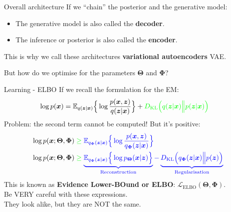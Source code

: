 \documentclass{beamer}
\newcommand{\bs}[1]{\boldsymbol{#1}}
\begin{document}
\begin{frame}{Overall architecture}
 If we ``chain'' the posterior and the generative model:\vspace{3mm}
   \vspace{3mm}
 
 \begin{itemize}
  \item The generative model is also called the \textbf{decoder}.
  \item The inference or posterior is also called the \textbf{encoder}.
 \end{itemize}\vspace{3mm}
 
 This is why we call these architectures \textbf{variational autoencoders} VAE.\vspace{3mm}
 
 But how do we optimise for the parameters $\bs{\Theta}$ and $\bs{\Phi}$?

\end{frame}

\begin{frame}{Learning - ELBO}
 If we recall the formulation for the EM:
 \begin{align}
\log p(\bs{x}) &= \mathbb{E}_{q(\bs{z}|\bs{x})}\Big\{\log \frac{p(\bs{x},\bs{z})}{q(\bs{z}|\bs{x})}\Big\} + {\color{green} D_{\text{KL}}\Big(q(\bs{z}|\bs{x})\Big\lVert p(\bs{z}|\bs{x})\Big)}
\end{align}
Problem: the second term cannot be computed! But it's positive:
 \begin{align}
\log p(\bs{x};\bs{\Theta},\bs{\Phi}) &\; {\color{green}\geq}\; {\color{blue} \mathbb{E}_{q_{\bs{\Phi}}(\bs{z}|\bs{x})}\Big\{\log \frac{p(\bs{x},\bs{z})}{q_{\bs{\Phi}}(\bs{z}|\bs{x})}\Big\}} \\
\log p(\bs{x};\bs{\Theta},\bs{\Phi}) &\; {\color{green}\geq}\; {\color{blue} \underbrace{\mathbb{E}_{q_{\bs{\Phi}}(\bs{z}|\bs{x})}\Big\{\log p_{\bs{\Theta}}(\bs{x}|\bs{z})\Big\}}_{\text{Reconstruction}} -  \underbrace{D_{\text{KL}}\Big(q_{\bs{\Phi}}(\bs{z}|\bs{x})\Big\lVert p(\bs{z})\Big)}_{\text{Regularisation}}}
\end{align}
This is known as \textbf{Evidence Lower-BOund or ELBO}: $\mathcal{L}_{\text{ELBO}}(\bs{\Theta},\bs{\Phi})$.\vspace{3mm}\\
Be VERY careful with these expressions.\\ They look alike, but they are NOT the same.
\end{frame}
\end{document}
